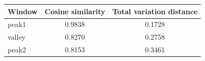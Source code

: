 \begin{tabular}{lcc}
\toprule
Window & Cosine similarity & Total variation distance \\
\midrule
peak1 & 0.9838 & 0.1728 \\
valley & 0.8270 & 0.2758 \\
peak2 & 0.8153 & 0.3461 \\
\bottomrule
\end{tabular}
